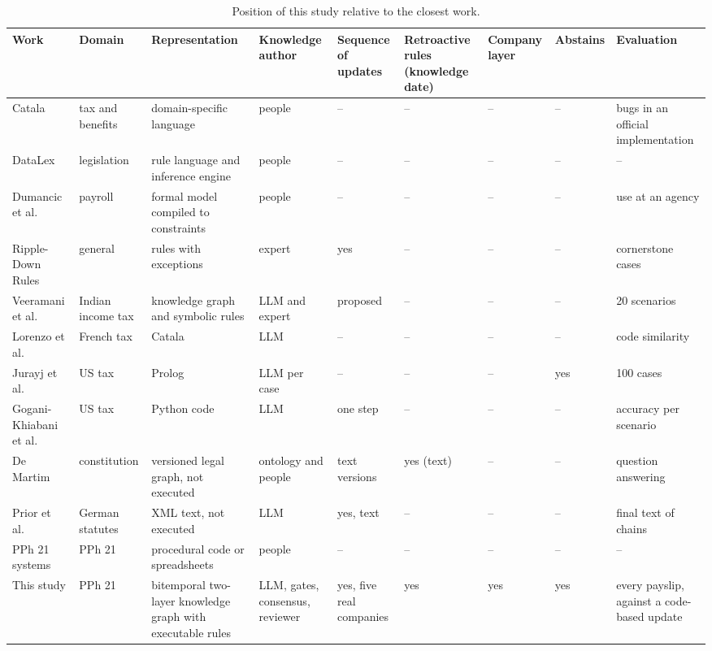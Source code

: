 \begin{table}[!t]
\caption{Position of this study relative to the closest work.}
\label{tab:position}
\centering\footnotesize
\setlength{\tabcolsep}{3pt}
\begin{tabularx}{\textwidth}{@{}P{3.1cm} P{1.8cm} L P{1.5cm} P{1.6cm} P{1.5cm} P{1.3cm} P{1.2cm} P{2.0cm}@{}}
\toprule
Work & Domain & Representation & Knowledge author & Sequence of updates & Retroactive rules (knowledge date) & Company layer & Abstains & Evaluation \\
\midrule
Catala~\cite{merigoux2021catala,huttner2022catala} & tax and benefits & domain-specific language & people & -- & -- & -- & -- & bugs in an official implementation \\
DataLex~\cite{mowbray2023scaling,mowbray2023xai} & legislation & rule language and inference engine & people & -- & -- & -- & -- & -- \\
Dumancic et al.~\cite{dumancic2021payroll} & payroll & formal model compiled to constraints & people & -- & -- & -- & -- & use at an agency \\
Ripple-Down Rules~\cite{compton2021rdr} & general & rules with exceptions & expert & yes & -- & -- & -- & cornerstone cases \\
Veeramani et al.~\cite{veeramani2026neurosymbolic} & Indian income tax & knowledge graph and symbolic rules & LLM and expert & proposed & -- & -- & -- & 20 scenarios \\
Lorenzo et al.~\cite{lorenzo2025translating} & French tax & Catala & LLM & -- & -- & -- & -- & code similarity \\
Jurayj et al.~\cite{jurayj2026tax} & US tax & Prolog & LLM per case & -- & -- & -- & yes & 100 cases \\
Gogani-Khiabani et al.~\cite{goganikhiabani2025maintaining} & US tax & Python code & LLM & one step & -- & -- & -- & accuracy per scenario \\
De Martim~\cite{demartim2025satgraph} & constitution & versioned legal graph, not executed & ontology and people & text versions & yes (text) & -- & -- & question answering \\
Prior et al.~\cite{prior2025risks} & German statutes & XML text, not executed & LLM & yes, text & -- & -- & -- & final text of chains \\
PPh 21 systems~\cite{ramadhani2021grossup,yulistyawati2022payroll,kusuma2026pph21} & PPh 21 & procedural code or spreadsheets & people & -- & -- & -- & -- & -- \\
\midrule
This study & PPh 21 & bitemporal two-layer knowledge graph with executable rules & LLM, gates, consensus, reviewer & yes, five real companies & yes & yes & yes & every payslip, against a code-based update \\
\bottomrule
\end{tabularx}
\end{table}
